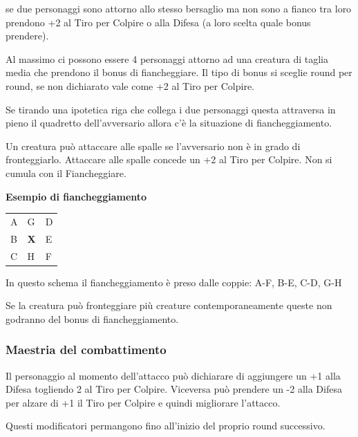 \begin{multicols}{2}
se due personaggi sono attorno allo stesso bersaglio ma non sono a fianco tra loro prendono +2 al Tiro per Colpire o alla Difesa (a loro scelta quale bonus prendere).

Al massimo ci possono essere 4 personaggi attorno ad una creatura di taglia media che prendono il bonus di fiancheggiare. Il tipo di bonus si sceglie round per round, se non dichiarato vale come +2 al Tiro per Colpire.

Se tirando una ipotetica riga che collega i due personaggi questa attraversa in pieno il quadretto dell'avversario allora c'è la situazione di fiancheggiamento.

Un creatura può attaccare alle spalle se l'avversario non è in grado di fronteggiarlo. Attaccare alle spalle concede un +2 al Tiro per Colpire. Non si cumula con il Fiancheggiare.

\medskip

\textbf{Esempio di fiancheggiamento}

\medskip
\begin{center}

\begin{tabular}{lll}
\hline
\rowcolor{gray!20}A & G & D\\
B & \textbf{X} & E\\
\rowcolor{gray!20}C & H & F
\end{tabular}
\end{center}

\bigskip

In questo schema il fiancheggiamento è preso dalle coppie: A-F, B-E, C-D, G-H

\bigskip

Se la creatura può fronteggiare più creature contemporaneamente queste non godranno del bonus di fiancheggiamento.

\subsubsection{Maestria del combattimento} \label{maestriacombattimento}

Il personaggio al momento dell'attacco può dichiarare di aggiungere un +1 alla Difesa togliendo 2 al Tiro per Colpire. Viceversa può prendere un -2 alla Difesa per alzare di +1 il Tiro per Colpire e quindi migliorare l'attacco.

Questi modificatori permangono fino all'inizio del proprio round successivo.


\end{multicols}
